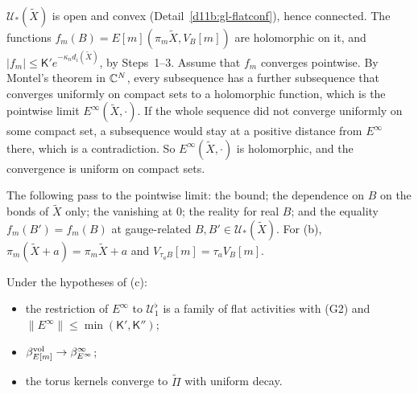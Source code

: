 \begin{step}
$\mathcal U_*(\tilde X)$ is open and convex (Detail~\ref{d11b:gl-flatconf}), hence connected. The functions $f_m(B)=E[m](\pi_m\tilde X,V_B[m])$ are holomorphic on it, and $|f_m|\le\mathsf K'e^{-\kappa_nd_i(\tilde X)}$, by Steps~1--3. Assume that $f_m$ converges pointwise. By Montel's theorem in $\mathbb C^N$, every subsequence has a further subsequence that converges uniformly on compact sets to a holomorphic function, which is the pointwise limit $E^\infty(\tilde X,\cdot)$. If the whole sequence did not converge uniformly on some compact set, a subsequence would stay at a positive distance from $E^\infty$ there, which is a contradiction. So $E^\infty(\tilde X,\cdot)$ is holomorphic, and the convergence is uniform on compact sets.

The following pass to the pointwise limit: the bound; the dependence on $B$ on the bonds of $\tilde X$ only; the vanishing at $0$; the reality for real $B$; and the equality $f_m(B')=f_m(B)$ at gauge-related $B,B'\in\mathcal U_*(\tilde X)$. For (b), $\pi_m(\tilde X+a)=\pi_m\tilde X+a$ and $V_{\tau_aB}[m]=\tau_aV_B[m]$.
\end{step}

\begin{detail}\label{d11b:gl-limits-c}
Under the hypotheses of (c):
\begin{itemize}
\item the restriction of $E^\infty$ to $\mathcal U^\flat_1$ is a family of flat activities with (G2) and $\|E^\infty\|\le\min(\mathsf K',\mathsf K'')$;
\item $\beta^{\rm vol}_{E[m]}\to\beta^\infty_{E^\infty}$;
\item the torus kernels converge to $\widetilde\Pi$ with uniform decay.
\end{itemize}
\end{detail}

